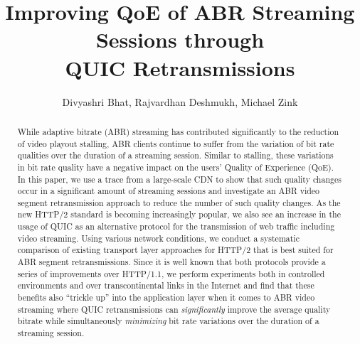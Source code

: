 \documentclass[acmsmall]{acmart}
\begin{document}
\title{Improving QoE of ABR Streaming Sessions through\\ QUIC Retransmissions}
\author{
\hspace{50pt} 
Divyashri Bhat, Rajvardhan Deshmukh, Michael Zink
}




\begin{abstract}
While adaptive bitrate (ABR) streaming has contributed significantly to the reduction of video playout stalling, ABR clients continue to suffer from the variation of bit rate qualities over the duration of a streaming session. Similar to stalling, these variations in bit rate quality have a negative impact on the users' Quality of Experience (QoE).
In this paper, we use a trace from a large-scale CDN to show that such quality changes occur in a significant amount of streaming sessions and investigate an ABR video segment retransmission approach to reduce the number of such quality changes. As the new HTTP/2 standard is becoming increasingly popular, we also see an increase in the usage of QUIC as an alternative protocol for the transmission of web traffic including video streaming. Using various network conditions, we conduct a systematic comparison of existing transport layer approaches for HTTP/2 that is best suited for ABR segment retransmissions. Since it is well known that both protocols provide a series of improvements over HTTP/1.1, we perform experiments both in controlled environments and over transcontinental links in the Internet and find that these benefits also ``trickle up'' into the application layer when it comes to ABR video streaming where QUIC retransmissions can \textit{significantly} improve the average quality bitrate while simultaneously \textit{minimizing} bit rate variations over the duration of a streaming session.
\end{abstract}
\maketitle
\end{document}
